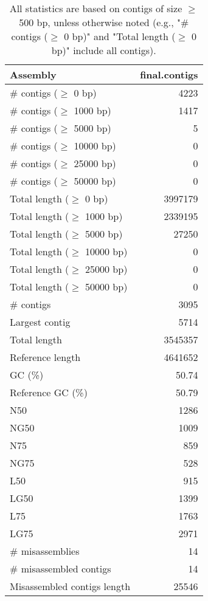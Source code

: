 \documentclass[12pt,a4paper]{article}
\begin{document}
\begin{table}[ht]
\begin{center}
\caption{All statistics are based on contigs of size $\geq$ 500 bp, unless otherwise noted (e.g., "\# contigs ($\geq$ 0 bp)" and "Total length ($\geq$ 0 bp)" include all contigs).}
\begin{tabular}{|l*{1}{|r}|}
\hline
Assembly & final.contigs \\ \hline
\# contigs ($\geq$ 0 bp) & 4223 \\ \hline
\# contigs ($\geq$ 1000 bp) & 1417 \\ \hline
\# contigs ($\geq$ 5000 bp) & 5 \\ \hline
\# contigs ($\geq$ 10000 bp) & 0 \\ \hline
\# contigs ($\geq$ 25000 bp) & 0 \\ \hline
\# contigs ($\geq$ 50000 bp) & 0 \\ \hline
Total length ($\geq$ 0 bp) & 3997179 \\ \hline
Total length ($\geq$ 1000 bp) & 2339195 \\ \hline
Total length ($\geq$ 5000 bp) & 27250 \\ \hline
Total length ($\geq$ 10000 bp) & 0 \\ \hline
Total length ($\geq$ 25000 bp) & 0 \\ \hline
Total length ($\geq$ 50000 bp) & 0 \\ \hline
\# contigs & 3095 \\ \hline
Largest contig & 5714 \\ \hline
Total length & 3545357 \\ \hline
Reference length & 4641652 \\ \hline
GC (\%) & 50.74 \\ \hline
Reference GC (\%) & 50.79 \\ \hline
N50 & 1286 \\ \hline
NG50 & 1009 \\ \hline
N75 & 859 \\ \hline
NG75 & 528 \\ \hline
L50 & 915 \\ \hline
LG50 & 1399 \\ \hline
L75 & 1763 \\ \hline
LG75 & 2971 \\ \hline
\# misassemblies & 14 \\ \hline
\# misassembled contigs & 14 \\ \hline
Misassembled contigs length & 25546 \\ \hline

\end{tabular}
\end{center}
\end{table}
\end{document}
